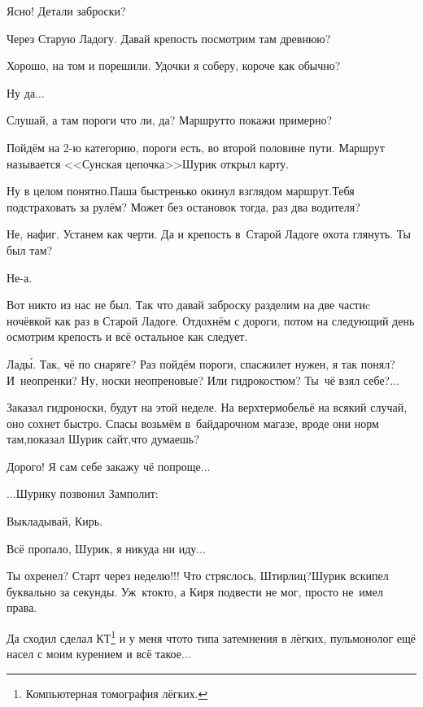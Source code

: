 \diagdash Ясно! Детали заброски?

\diagdash Через Старую Ладогу. Давай крепость посмотрим там древнюю?

\diagdash Хорошо, на том и порешили. Удочки я соберу, короче как обычно?

\diagdash Ну да$\ldots$

\diagdash Слушай, а там пороги что ли, да? Маршрут\sdash то покажи примерно?

\diagdash Пойдём на 2-ю категорию, пороги есть, во второй половине пути. Маршрут называется <<Сунская цепочка>>\mdash Шурик открыл карту.

\diagdash Ну в целом понятно.\mdash Паша быстренько окинул взглядом маршрут.\mdash Тебя подстраховать за рулём? Может без остановок тогда, раз два водителя?

\diagdash Не, нафиг. Устанем как черти. Да и крепость в~Старой Ладоге охота глянуть. Ты был там?

\diagdash Не-а.

\diagdash Вот никто из нас не был. Так что давай заброску разделим на две части\mdash c ночёвкой как раз в Старой Ладоге. Отдохнём с дороги, потом на следующий день осмотрим крепость и всё остальное как следует.

\diagdash Лад\'{ы}. Так, чё по снаряге? Раз пойдём пороги, спасжилет нужен, я так понял? И~неопренки? Ну, носки неопреновые? Или гидрокостюм? Ты~чё взял себе?$\ldots$

\diagdash Заказал гидроноски, будут на этой неделе. На верх\mdash термобельё на всякий случай, оно сохнет быстро. Спасы возьмём в~байдарочном магазе, вроде они норм там,\mdash показал Шурик сайт,\mdash что думаешь?

\diagdash Дорого! Я сам себе закажу чё попроще$\ldots$

\vspace{0.5cm}
$\ldots$Шурику позвонил Замполит:

\diagdash Выкладывай, Кирь.

\diagdash Всё пропало, Шурик, я никуда ни иду$\ldots$

\diagdash Ты охренел? Старт через неделю!!! Что стряслось, Штирлиц?\mdash Шурик вскипел буквально за секунды. Уж~кто\sdash кто, а Киря подвести не мог, просто не~имел права. 

\setcounter{footnote}{0}
\renewcommand*{\thefootnote}{\fnsymbol{footnote}}
\diagdash Да сходил сделал КТ\footnote{Компьютерная томография лёгких.} и у меня что\sdash то типа затемнения в лёгких, пульмонолог ещё насел с моим курением и всё такое$\ldots$

